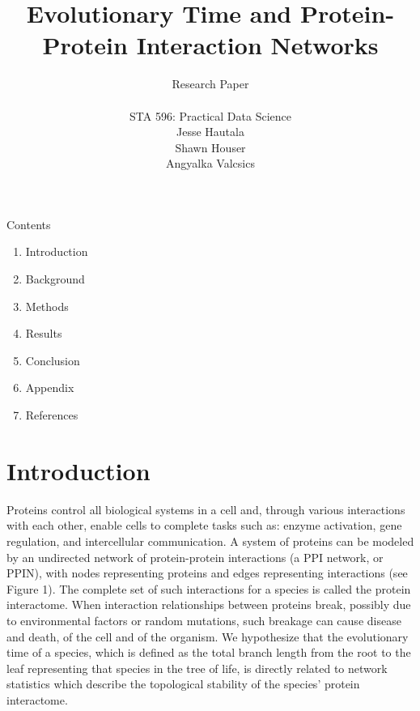 \documentclass[12pt]{article}
\begin{document}
\title{\textbf{Evolutionary Time and Protein-Protein Interaction Networks}}
\author{Research Paper \\ \\ STA 596: Practical Data Science \\ Jesse Hautala \\ Shawn Houser \\ Angyalka Valcsics }

	\maketitle
\onehalfspacing

\noindent Contents
\begin{enumerate}[label = \Roman{*}.]
\item Introduction
\item Background
\item Methods
\item Results
\item Conclusion
\item Appendix
\item References \newline
\end{enumerate}

\section{Introduction}
Proteins control all biological systems in a cell and, through various interactions with each other, enable cells to complete tasks such as: enzyme activation, gene regulation, and intercellular communication. A system of proteins can be modeled by an undirected network of protein-protein interactions (a PPI network, or PPIN), with nodes representing proteins and edges representing interactions (see Figure 1). The complete set of such interactions for a species is called the protein interactome. When interaction relationships between proteins break, possibly due to environmental factors or random mutations, such breakage can cause disease and death, of the cell and of the organism. We hypothesize that the evolutionary time of a species, which is defined as the total branch length from the root to the leaf representing that species in the tree of life, is directly related to network statistics which describe the topological stability of the species’ protein interactome.
\end{document}
